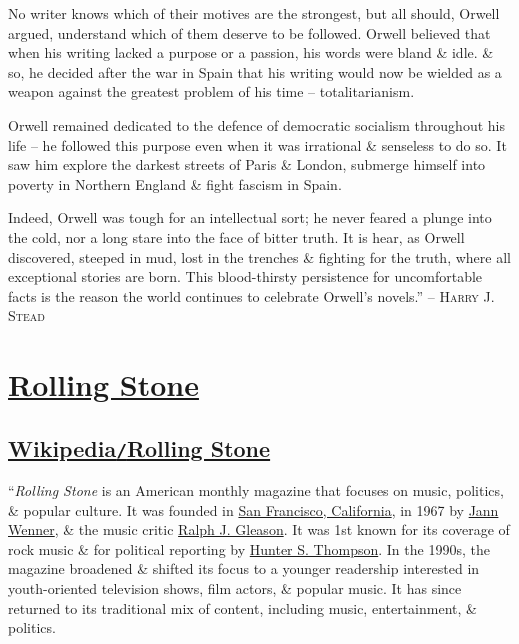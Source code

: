 \documentclass[oneside]{book}
\numberwithin{equation}{section}
\begin{document}
No writer knows which of their motives are the strongest, but all should, Orwell argued, understand which of them deserve to be followed. Orwell believed that when his writing lacked a purpose or a passion, his words were bland \& idle. \& so, he decided after the war in Spain that his writing would now be wielded as a weapon against the greatest problem of his time -- totalitarianism.

Orwell remained dedicated to the defence of democratic socialism throughout his life -- he followed this purpose even when it was irrational \& senseless to do so. It saw him explore the darkest streets of Paris \& London, submerge himself into poverty in Northern England \& fight fascism in Spain.

Indeed, Orwell was tough for an intellectual sort; he never feared a plunge into the cold, nor a long stare into the face of bitter truth. It is hear, as Orwell discovered, steeped in mud, lost in the trenches \& fighting for the truth, where all exceptional stories are born. This blood-thirsty persistence for uncomfortable facts is the reason the world continues to celebrate Orwell's novels.'' -- \textsc{Harry J. Stead}


\chapter{\href{https://www.rollingstone.com/}{Rolling Stone}}

\section{\href{https://en.wikipedia.org/wiki/Rolling_Stone}{Wikipedia\texttt{/}Rolling Stone}}
``\textit{Rolling Stone} is an American monthly magazine that focuses on music, politics, \& popular culture. It was founded in \href{https://en.wikipedia.org/wiki/San_Francisco}{San Francisco, California}, in 1967 by \href{https://en.wikipedia.org/wiki/Jann_Wenner}{Jann Wenner}, \& the music critic \href{https://en.wikipedia.org/wiki/Ralph_J._Gleason}{Ralph J. Gleason}. It was 1st known for its coverage of rock music \& for political reporting by \href{https://en.wikipedia.org/wiki/Ralph_J._Gleason}{Hunter S. Thompson}. In the 1990s, the magazine broadened \& shifted its focus to a younger readership interested in youth-oriented television shows, film actors, \& popular music. It has since returned to its traditional mix of content, including music, entertainment, \& politics.
\end{document}
